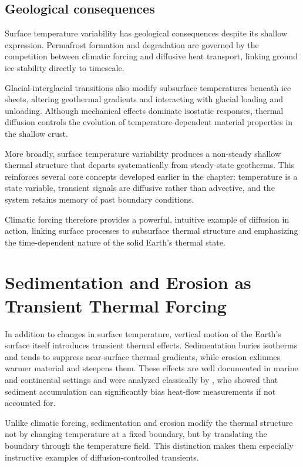 \subsection{Geological consequences}

Surface temperature variability has geological consequences despite its shallow expression. Permafrost formation and degradation are governed by the competition between climatic forcing and diffusive heat transport, linking ground ice stability directly to timescale.

Glacial-interglacial transitions also modify subsurface temperatures beneath ice sheets, altering geothermal gradients and interacting with glacial loading and unloading.  Although mechanical effects dominate isostatic responses, thermal diffusion controls the evolution of temperature-dependent material properties in the shallow crust.

More broadly, surface temperature variability produces a non-steady shallow thermal structure that departs systematically from steady-state geotherms. This reinforces several core concepts developed earlier in the chapter: temperature is a state variable, transient signals are diffusive rather than advective, and the system retains memory of past boundary conditions.

Climatic forcing therefore provides a powerful, intuitive example of diffusion in action, linking surface processes to subsurface thermal structure and emphasizing the time-dependent nature of the solid Earth's thermal state.

\section{Sedimentation and Erosion as Transient Thermal Forcing}

In addition to changes in surface temperature, vertical motion of the Earth's surface itself introduces transient thermal effects. Sedimentation buries isotherms and tends to suppress near-surface thermal gradients, while erosion exhumes warmer material and steepens them. These effects are well documented in marine and continental settings and were analyzed classically by \citet{VonHerzen&Uyeda1963}, who showed that sediment accumulation can significantly bias heat-flow measurements if not accounted for.

Unlike climatic forcing, sedimentation and erosion modify the thermal structure not by changing temperature at a fixed boundary, but by translating the boundary through the temperature field. This distinction makes them especially instructive examples of diffusion-controlled transients.

